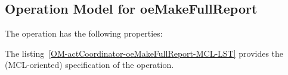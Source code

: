 \subsection{Operation Model for oeMakeFullReport}

\label{OM-oeMakeFullReport}


The  operation has the following properties:

	\begin{operationmodel}



		


	\end{operationmodel}



	\vspace{1cm}
	The listing~\ref{OM-actCoordinator-oeMakeFullReport-MCL-LST} provides the \msrmessir (MCL-oriented) specification of the operation.
	
